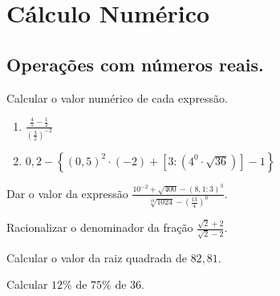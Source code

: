 \chapter{Cálculo Numérico}
\section{Operações com números reais.}

\item Calcular o valor numérico de cada expressão.
\begin{multicols}{2}
\begin{enumerate}

	\item $\displaystyle{
			\frac{\displaystyle{\frac{4}{5}-\frac{1}{2}}}{\displaystyle{\left(\frac{3}{2}\right)^{-2}}}
			}$
	\item $0,2-\left\{(0,5)^2\cdot(-2)+\left[3:(4^0\cdot\sqrt{36})\right]-1\right\}$
\end{enumerate}
\end{multicols}
	\item Dar o valor da expressão 
		$\displaystyle{
		\frac{10^{-2}+\sqrt{400}-(8,1:3)^{3}}
		{\displaystyle\sqrt[10]{1024}-\left(\displaystyle\frac{13}{4}\right)^0}
		}$.
	\item Racionalizar o denominador da fração $\displaystyle{\frac{\sqrt{2}+2}{\sqrt{2}-2}}$.
	\item Calcular o valor da raiz quadrada de $82,81$.
	\item Calcular $12\%$ de $75\%$ de 36.

